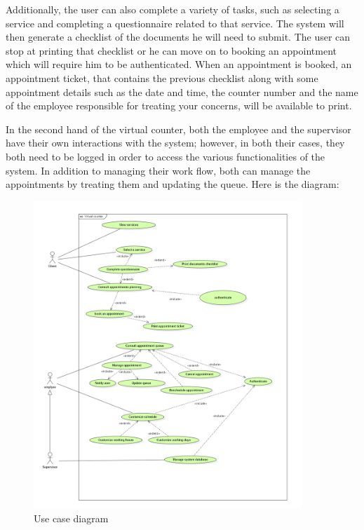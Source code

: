  Additionally, the user can also complete a variety of tasks, such as selecting a service and completing a questionnaire related to that service. The system will then generate a checklist of the documents he will need to submit. The user can stop at printing that checklist or he can move on to booking an appointment which will require him to be authenticated. When an appointment is booked, an appointment ticket, that contains the previous checklist along with some appointment details such as the date and time, the counter number and the name of the employee responsible for treating your concerns,  will be available to print. 
 
 \medskip In the second hand of the virtual counter, both the employee and the supervisor have their own interactions with the system; however, in both their cases, they both need to be logged in order to access the various functionalities of the system. In addition to managing their work flow, both can manage the appointments by treating them and updating the queue. 
\newpage
 \medskip Here is the diagram:

 \begin{figure}[H]
    \centering
    \includegraphics[width=0.90\textwidth]{useCASE.png}
    \caption{Use case diagram}
    \label{ucdiagram}
 \end{figure}
 
